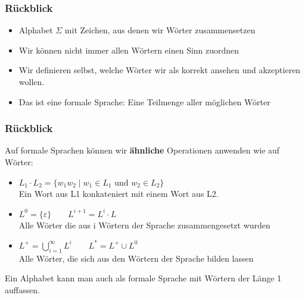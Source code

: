 \framePrevEpisode

\begin{frame}
	\frametitle{Rückblick}
	\begin{itemize}
		\item Alphabet $\Sigma$ mit Zeichen, aus denen wir Wörter zusammensetzen
		\item Wir können nicht immer allen Wörtern einen Sinn zuordnen 
		\item Wir definieren selbst, welche Wörter wir als korrekt ansehen und akzeptieren wollen.
		\item Das ist eine formale Sprache: Eine Teilmenge aller möglichen Wörter
	\end{itemize}
\end{frame}

\begin{frame}
	\frametitle{Rückblick}
	Auf formale Sprachen können wir \textbf{ähnliche} Operationen anwenden wie auf Wörter:
	\begin{itemize}
		\item $L_1 \cdot L_2 = \{w_1 w_2 \mid w_1 \in L_1 \text{ und } w_2 \in L_2 \}$\\
		Ein Wort aus L1 konkateniert mit einem Wort aus L2.
		\pause
		\item $L^0 = \{\varepsilon \} \qquad L^{i+1} = L^i \cdot L$\\
		Alle Wörter die aus i Wörtern der Sprache zusammengesetzt wurden
		\pause
		\item $L^+ = \bigcup \limits_{i=1}^\infty L^i \qquad L^* = L^+ \cup L^0$\\
		Alle Wörter, die sich aus den Wörtern der Sprache bilden lassen
	\end{itemize}
	Ein Alphabet kann man auch als formale Sprache mit Wörtern der Länge 1 auffassen.
\end{frame}

\begin{frame}
	\begin{itemize}
	\end{itemize}	
\end{frame}

